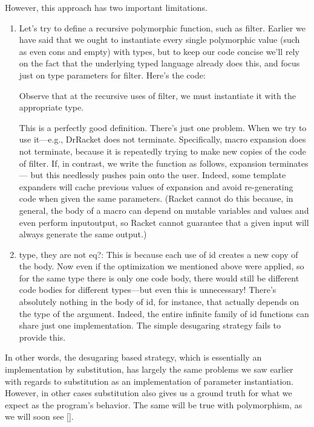 However, this approach has two important limitations.
\begin{enumerate}
  \item 
Let’s try to define a recursive polymorphic function, such as filter. Earlier we
have said that we ought to instantiate every single polymorphic value (such as
even cons and empty) with types, but to keep our code concise we’ll rely on the
fact that the underlying typed language already does this, and focus just on
type parameters for filter. Here’s the code:

Observe that at the recursive uses of filter, we must instantiate it with the
appropriate type.

This is a perfectly good definition. There’s just one problem. When we try to
use it—e.g.,
DrRacket does not terminate. Specifically, macro expansion does not terminate,
because it is repeatedly trying to make new copies of the code of filter. If, in
contrast, we write the function as follows, expansion terminates—
but this needlessly pushes pain onto the user. Indeed, some template expanders
will cache previous values of expansion and avoid re-generating code when given
the same parameters. (Racket cannot do this because, in general, the body of
a macro can depend on mutable variables and values and even perform inputoutput,
so Racket cannot guarantee that a given input will always generate the
same output.)

  \item 
type, they are not eq?:
This is because each use of id creates a new copy of the body. Now even if the
optimization we mentioned above were applied, so for the same type there is only
one code body, there would still be different code bodies for different
types—but even this is unnecessary! There’s absolutely nothing in the body of
id, for instance, that actually depends on the type of the argument. Indeed, the
entire infinite family of id functions can share just one implementation. The
simple desugaring strategy fails to provide this.

\end{enumerate}

In other words, the desugaring based strategy, which is essentially an
implementation by substitution, has largely the same problems we saw earlier
with regards to substitution as an implementation of parameter instantiation.
However, in other cases substitution also gives us a ground truth for what we
expect as the program’s behavior. The same will be true with polymorphism, as we
will soon see \ref{}.

